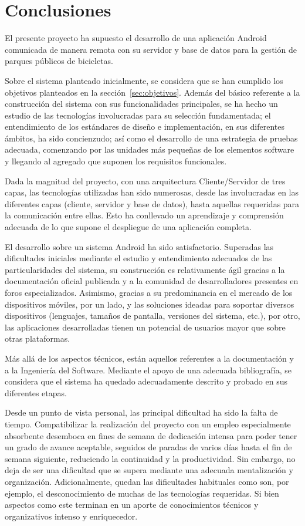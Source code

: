 \chapter{Conclusiones}

El presente proyecto ha supuesto el desarrollo de una aplicación Android comunicada de manera remota con su servidor y base de datos para la gestión de parques públicos de bicicletas.

Sobre el sistema planteado inicialmente, se considera que se han cumplido los objetivos planteados en la sección~\ref{sec:objetivos}. Además del básico referente a la construcción del sistema con sus funcionalidades principales, se ha hecho un estudio de las tecnologías involucradas para su selección fundamentada; el entendimiento de los estándares de diseño e implementación, en sus diferentes ámbitos, ha sido concienzudo; así como el desarrollo de una estrategia de pruebas adecuada, comenzando por las unidades más pequeñas de los elementos software y llegando al agregado que suponen los requisitos funcionales.

Dada la magnitud del proyecto, con una arquitectura Cliente/Servidor de tres capas, las tecnologías utilizadas han sido numerosas, desde las involucradas en las diferentes capas (cliente, servidor y base de datos), hasta aquellas requeridas para la comunicación entre ellas. Esto ha conllevado un aprendizaje y comprensión adecuada de lo que supone el despliegue de una aplicación completa.

El desarrollo sobre un sistema Android ha sido satisfactorio. Superadas las dificultades iniciales mediante el estudio y entendimiento adecuados de las particularidades del sistema, su construcción es relativamente ágil gracias a la documentación oficial publicada y a la comunidad de desarrolladores presentes en foros especializados. Asimismo, gracias a su predominancia en el mercado de los dispositivos móviles, por un lado, y las soluciones ideadas para soportar diversos dispositivos (lenguajes, tamaños de pantalla, versiones del sistema, etc.), por otro, las aplicaciones desarrolladas tienen un potencial de usuarios mayor que sobre otras plataformas.

Más allá de los aspectos técnicos, están aquellos referentes a la documentación y a la Ingeniería del Software. Mediante el apoyo de una adecuada bibliografía, se considera que el sistema ha quedado adecuadamente descrito y probado en sus diferentes etapas.

Desde un punto de vista personal, las principal dificultad ha sido la falta de tiempo. Compatibilizar la realización del proyecto con un empleo especialmente absorbente desemboca en fines de semana de dedicación intensa para poder tener un grado de avance aceptable, seguidos de paradas de varios días hasta el fin de semana siguiente, reduciendo la continuidad y la productividad. Sin embargo, no deja de ser una dificultad que se supera mediante una adecuada mentalización y organización. Adicionalmente, quedan las dificultades habituales como son, por ejemplo, el desconocimiento de muchas de las tecnologías requeridas. Si bien aspectos como este terminan en un aporte de conocimientos técnicos y organizativos intenso y enriquecedor.

